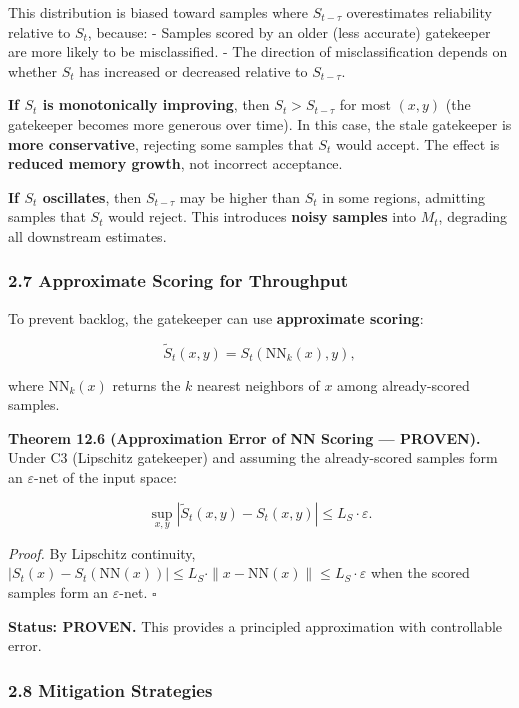 \documentclass[
  12pt,
]{article}
\begin{document}
This distribution is biased toward samples where \(S_{t-\tau}\)
overestimates reliability relative to \(S_t\), because: - Samples scored
by an older (less accurate) gatekeeper are more likely to be
misclassified. - The direction of misclassification depends on whether
\(S_t\) has increased or decreased relative to \(S_{t-\tau}\).

\textbf{If \(S_t\) is monotonically improving}, then
\(S_t > S_{t-\tau}\) for most \((x,y)\) (the gatekeeper becomes more
generous over time). In this case, the stale gatekeeper is \textbf{more
conservative}, rejecting some samples that \(S_t\) would accept. The
effect is \textbf{reduced memory growth}, not incorrect acceptance.

\textbf{If \(S_t\) oscillates}, then \(S_{t-\tau}\) may be higher than
\(S_t\) in some regions, admitting samples that \(S_t\) would reject.
This introduces \textbf{noisy samples} into \(M_t\), degrading all
downstream estimates.

\subsubsection{2.7 Approximate Scoring for
Throughput}\label{approximate-scoring-for-throughput}

To prevent backlog, the gatekeeper can use \textbf{approximate scoring}:

\[\tilde{S}_t(x,y) = S_t(\text{NN}_k(x), y),\]

where \(\text{NN}_k(x)\) returns the \(k\) nearest neighbors of \(x\)
among already-scored samples.

\textbf{Theorem 12.6 (Approximation Error of NN Scoring --- PROVEN).}
Under C3 (Lipschitz gatekeeper) and assuming the already-scored samples
form an \(\varepsilon\)-net of the input space:

\[\sup_{x,y} |\tilde{S}_t(x,y) - S_t(x,y)| \leq L_S \cdot \varepsilon.\]

\emph{Proof.} By Lipschitz continuity,
\(|S_t(x) - S_t(\text{NN}(x))| \leq L_S \cdot \|x - \text{NN}(x)\| \leq L_S \cdot \varepsilon\)
when the scored samples form an \(\varepsilon\)-net. \(\square\)

\textbf{Status: PROVEN.} This provides a principled approximation with
controllable error.

\subsubsection{2.8 Mitigation Strategies}\label{mitigation-strategies-1}
\end{document}
